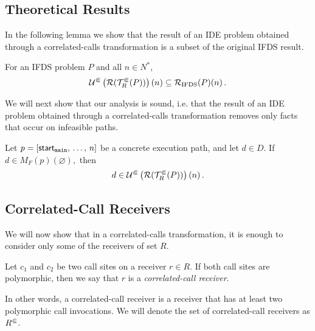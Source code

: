 \subsection{Theoretical Results}

In the following lemma we show that the result of an IDE problem obtained through a correlated-calls transformation is a subset of the original IFDS result.

\begin{lemma}[Precision]\label{lem:subsetifds}
    For an IFDS problem $P$ and all ${n\in N^*}$,
    \begin{equation}\label{eq:correct}
      \mathcal U^\Subset\left(\mathcal R(\mathcal T^\Subset_R(P))\right)(n)
      \subseteq
      \mathcal R_{\text{IFDS}}(P)(n)\,.
    \end{equation}
\end{lemma}

We will next show that our analysis is sound, i.e. that the result of an IDE problem obtained through a correlated-calls transformation removes only facts that occur on infeasible paths. 

\begin{lemma}[Soundness]\label{lem:sound}
  Let $p=[\textsf{start}_\texttt{main},\,\dots,\,n]$ be a concrete execution path, and let $d\in D$.
  If $d\in M_F(p)(\varnothing),$
  then
  \begin{equation}
    d\in \mathcal U^\Subset\left(\mathcal R(\mathcal T^\Subset_R(P))\right)(n)\,.
  \end{equation}
\end{lemma}

\subsection{Correlated-Call Receivers}\label{sec:ccreceivers}
We will now show that in a correlated-calls transformation, it is enough to consider only some of the receivers of set $R$.

\begin{definition}
Let $c_1$ and $c_2$ be two call sites on a receiver $r\in R$.
  If both call sites are polymorphic, then we say that $r$ is a \textit{correlated-call receiver}.
\end{definition}
In other words, a correlated-call receiver is a receiver that has at least two polymorphic call invocations.
We will denote the set of correlated-call receivers as ${R^\Subset}$.

